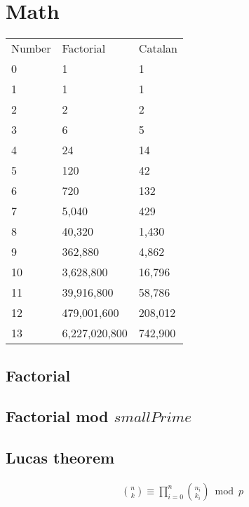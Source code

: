 \section{Math}

\begin{tabular}{ |p{1cm}|p{3cm}|p{3cm}|  }
  \hline  
  \rowcolor{Blue} 
  \multicolumn{3}{|c|}{Math table} \\ \hline
  \rowcolor{LightBlue2} 
  Number & Factorial & Catalan \\ \hline
  0 & 1 & 1 \\ \hline
  \rowcolor{Gray} 
  1 & 1 & 1 \\ \hline
  2 & 2 & 2 \\ \hline
  \rowcolor{Gray} 
  3 & 6 & 5 \\ \hline
  4 & 24 & 14 \\ \hline
  \rowcolor{Gray} 
  5 & 120 & 42 \\ \hline
  6 & 720 & 132 \\ \hline
  \rowcolor{Gray} 
  7 & 5,040 & 429 \\ \hline
  8 & 40,320 & 1,430 \\ \hline
  \rowcolor{Gray} 
  9 & 362,880 & 4,862 \\ \hline
  10 & 3,628,800 & 16,796 \\ \hline
  \rowcolor{Gray} 
  11 & 39,916,800 & 58,786 \\ \hline
  12 & 479,001,600 & 208,012 \\ \hline
  \rowcolor{Gray} 
  13 & 6,227,020,800 & 742,900 \\ \hline
\end{tabular}
\vspace{-5pt}

\subsection{Factorial} 

\subsection{Factorial mod $smallPrime$} 

\subsection{Lucas theorem}
\begin{gather*}
\binom{n}{k} \equiv \prod_{i = 0}^{n}\binom{n_i}{k_i} \bmod{p}
\end{gather*}
\vspace{-15pt}

